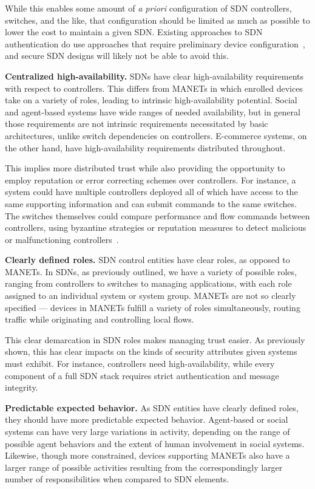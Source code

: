 \documentclass[10pt,conference]{IEEEtran}
\begin{document}
While this enables some amount of {\sl a priori} configuration of SDN controllers, switches, and the like, that configuration should be limited as much as possible to lower the cost to maintain a given SDN.  Existing approaches to SDN authentication do use approaches that require preliminary device configuration~\cite{CaFrPeLu:07}, and secure SDN designs will likely not be able to avoid this.

\noindent
{\bf Centralized high-availability.} SDNs have clear high-availability requirements with respect to controllers.  This differs from MANETs in which enrolled devices take on a variety of roles, leading to intrinsic high-availability potential.  Social and agent-based systems have wide ranges of needed availability, but in general those requirements are not intrinsic requirements necessitated by basic architectures, unlike switch dependencies on controllers.  E-commerce systems, on the other hand, have high-availability requirements distributed throughout.

This implies more distributed trust while also providing the opportunity to employ reputation or error correcting schemes over controllers.  For instance, a system could have multiple controllers deployed all of which have access to the same supporting information and can submit commands to the same switches.  The switches themselves could compare performance and flow commands between controllers, using byzantine strategies or reputation measures to detect malicious or malfunctioning controllers~\cite{FeMi:88, TaKaCh:11}.

\noindent
{\bf Clearly defined roles.} SDN control entities have clear roles, as opposed to MANETs.  In SDNs, as previously outlined, we have a variety of possible roles, ranging from controllers to switches to managing applications, with each role assigned to an individual system or system group.  MANETs are not so clearly specified --- devices in MANETs fulfill a variety of roles simultaneously, routing traffic while originating and controlling local flows.

This clear demarcation in SDN roles makes managing trust easier.  As previously shown, this has clear impacts on the kinds of security attributes given systems must exhibit.  For instance, controllers need high-availability, while every component of a full SDN stack requires strict authentication and message integrity.

\noindent
{\bf Predictable expected behavior.} As SDN entities have clearly defined roles, they should have more predictable expected behavior.  Agent-based or social systems can have very large variations in activity, depending on the range of possible agent behaviors and the extent of human involvement in social systems.  Likewise, though more constrained, devices supporting MANETs also have a larger range of possible activities resulting from the correspondingly larger number of responsibilities when compared to SDN elements.
\end{document}
